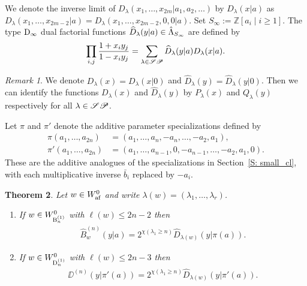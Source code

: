 \documentclass[a4paper]{amsart}
\newtheorem{thm}{Theorem}[section]
\theoremstyle{remark}
\newtheorem{remark}[thm]{Remark}
\numberwithin{equation}{section}
\begin{document}
We denote the inverse limit of $D_\lambda(x_1,\dots,x_{2m}| a_1,a_2,\dots)$ by $D_\lambda(x| a)$ as $D_\lambda(x_1,\dots,x_{2m-2}| a)=D_\lambda(x_1,\dots,x_{2m-2},0,0| a).$ 
Set \(S_\infty:=\mathbb Z[a_i\mid i\ge1]\).
The type $\mathrm{D}_{\infty}$ dual factorial functions
$\widehat{D}_\lambda(y| a)\in\hat{\Lambda}_{S_\infty}$
are defined by
\begin{equation}
\prod_{i,j} \frac{1 + x_i y_j}{1 - x_i y_j}
= \sum_{\lambda\in \mathscr{SP}} \widehat{D}_\lambda(y| a) D_\lambda(x|  a).
\end{equation}

 


\begin{remark}\label{rem_eq}
    We denote ${D}_\lambda(x)={D}_\lambda(x| 0)$ and $\widehat{D}_\lambda(y)=\widehat{D}_\lambda(y| 0)$. Then we can identify the functions $D_\lambda(x)$ and  $\widehat{D}_\lambda(y)$ by $P_{\lambda}(x)$ and $Q_\lambda(y)$ respectively for all $\lambda\in \mathscr{SP}$.
\end{remark}

Let \(\pi\) and \(\pi'\) denote the additive parameter
specializations defined by
\[
\begin{aligned}
\pi(a_1,\ldots,a_{2n})
&=(a_1,\ldots,a_n,-a_n,\ldots,-a_2,a_1),\\
\pi'(a_1,\ldots,a_{2n})
&=(a_1,\ldots,a_{n-1},0,-a_{n-1},\ldots,-a_2,a_1,0).
\end{aligned}
\]
These are the additive analogues of the specializations in
Section~\ref{S: small_cl}, with each multiplicative inverse \(\bar b_i\)
replaced by \(-a_i\).

\begin{thm}\label{small class hom type BD}
Let $w\in W_{\mathrm{af}}^0$ and write $\lambda(w)=(\lambda_1,\dots,\lambda_r)$.
\begin{enumerate}
\item If $w\in W_{\mathrm{B}_{n}^{(1)}}^0$ with $\ell(w)\le 2n-2$ then
\begin{align}\label{E:QB}
    \widehat{B}_w^{(n)}(y| a)=2^{\chi(\lambda_1\ge n)} \widehat{D}_{\lambda(w)}(y| \pi(a)).
\end{align}
\item If $w\in W_{\mathrm{D}_{n}^{(1)}}^0$ with $\ell(w)\le 2n-3$ then 
\begin{align}\label{E:QD}
    \DD^{(n)}(y| \pi'(a))=2^{\chi(\lambda_1\ge n)} \widehat{D}_{\lambda(w)}(y| \pi'(a)).
\end{align}
\end{enumerate}
\end{thm}
\end{document}
